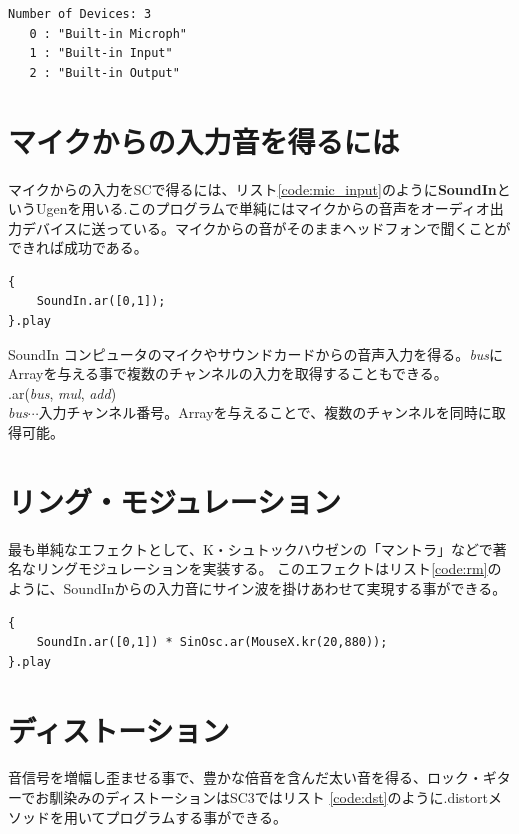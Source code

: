 \documentclass{jsarticle}
\begin{document}
\begin{lstlisting}[caption=入出力デバイスのリスト,label=device_list]
Number of Devices: 3
   0 : "Built-in Microph"
   1 : "Built-in Input"
   2 : "Built-in Output"
\end{lstlisting}

\section{マイクからの入力音を得るには}
マイクからの入力をSCで得るには、リスト\ref{code:mic_input}のように{\bf SoundIn}というUgenを用いる.このプログラムで単純にはマイクからの音声をオーディオ出力デバイスに送っている。マイクからの音がそのままヘッドフォンで聞くことができれば成功である。

\begin{lstlisting}[caption=マイク入力,label=code:mic_input]
{
	SoundIn.ar([0,1]);
}.play
\end{lstlisting}

\begin{itembox}[l]{SoundIn}
{\footnotesize 
コンピュータのマイクやサウンドカードからの音声入力を得る。{\it bus}にArrayを与える事で複数のチャンネルの入力を取得することもできる。\\
.ar({\it bus}, {\it mul}, {\it add})\\
{\it bus}$\cdots$入力チャンネル番号。Arrayを与えることで、複数のチャンネルを同時に取得可能。\\
}
\end{itembox}

\section{リング・モジュレーション}

最も単純なエフェクトとして、K・シュトックハウゼンの「マントラ」などで著名なリングモジュレーションを実装する。
このエフェクトはリスト\ref{code:rm}のように、SoundInからの入力音にサイン波を掛けあわせて実現する事ができる。

\begin{lstlisting}[caption=リング・モジュレーション,label=code:rm]
{
	SoundIn.ar([0,1]) * SinOsc.ar(MouseX.kr(20,880));
}.play
\end{lstlisting}

\section{ディストーション}
音信号を増幅し歪ませる事で、豊かな倍音を含んだ太い音を得る、ロック・ギターでお馴染みのディストーションはSC3ではリスト
\ref{code:dst}のように.distortメソッドを用いてプログラムする事ができる。
\end{document}
